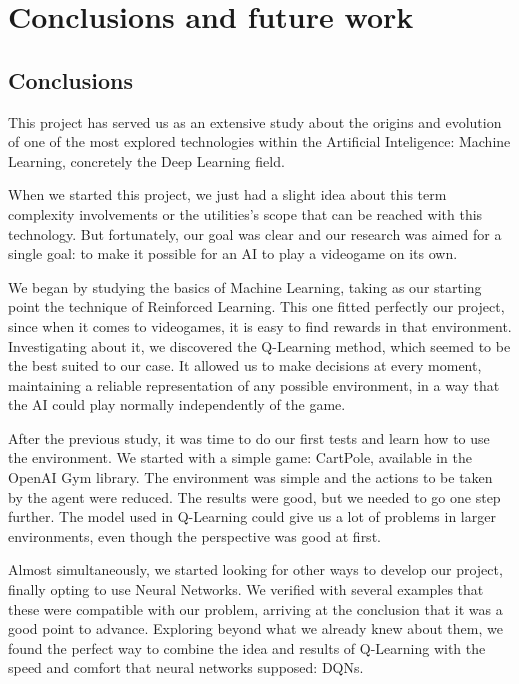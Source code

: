 \chapter{Conclusions and future work}
\label{cap:conclusions}


\section{Conclusions}

This project has served us as an extensive study about the origins and evolution of one of the most explored technologies within the Artificial Inteligence: Machine Learning, concretely the Deep Learning field.

When we started this project, we just had a slight idea about this term complexity involvements or the utilities's scope that can be reached with this technology. But fortunately, our goal was clear and our research was aimed for a single goal: to make it possible for an AI to play a videogame on its own.

We began by studying the basics of Machine Learning, taking as our starting point the technique of Reinforced Learning. This one fitted perfectly our project, since when it comes to videogames, it is easy to find rewards in that environment. Investigating about it, we discovered the Q-Learning method, which seemed to be the best suited to our case. It allowed us to make decisions at every moment, maintaining a reliable representation of any possible environment, in a way that the AI could play normally independently of the game.

After the previous study, it was time to do our first tests and learn how to use the environment. We started with a simple game: CartPole, available in the OpenAI Gym library. The environment was simple and the actions to be taken by the agent were reduced. The results were good, but we needed to go one step further. The model used in Q-Learning could give us a lot of problems in larger environments, even though the perspective was good at first.

Almost simultaneously, we started looking for other ways to develop our project, finally opting to use Neural Networks. We verified with several examples that these were compatible with our problem, arriving at the conclusion that it was a good point to advance. Exploring beyond what we already knew about them, we found the perfect way to combine the idea and results of Q-Learning with the speed and comfort that neural networks supposed: DQNs.

